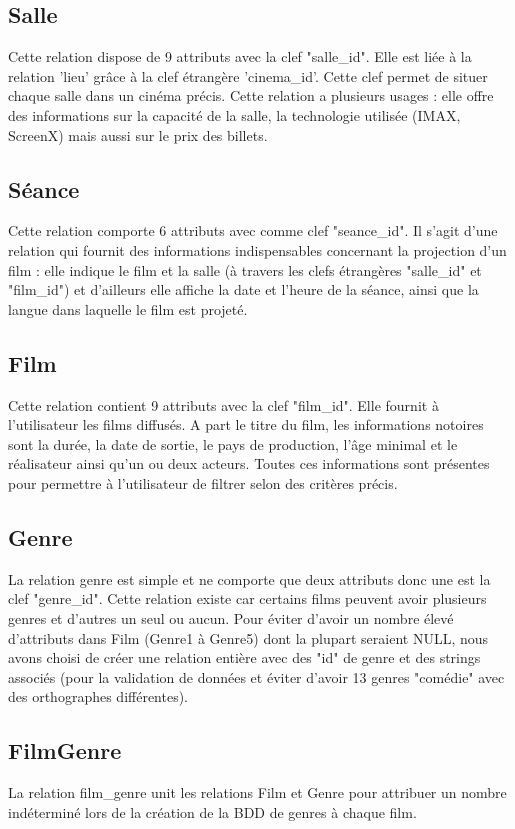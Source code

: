\documentclass[12pt]{article}
\begin{document}
\subsection{Salle}
Cette relation dispose de 9 attributs avec la clef "salle{\_}id".
Elle est liée à la relation 'lieu' grâce à la clef étrangère 'cinema{\_}id'. Cette clef permet de situer chaque salle
dans un cinéma précis. Cette relation a plusieurs usages : elle offre des informations sur la capacité de la salle,
la technologie utilisée (IMAX, ScreenX) mais aussi sur le prix des billets.
\subsection{Séance}
Cette relation comporte 6 attributs avec comme clef "seance{\_}id". Il s'agit d'une relation qui fournit des informations
indispensables concernant la projection d'un film : elle indique le film et la salle (à travers les clefs étrangères "salle{\_}id"
et "film{\_}id") et d'ailleurs elle affiche la date et l'heure de la séance, ainsi que la langue dans laquelle le film est projeté.
\subsection{Film}
Cette relation contient 9 attributs avec la clef "film{\_}id". Elle fournit à l'utilisateur les films diffusés.
A part le titre du film, les informations notoires sont la durée, la date de sortie, le pays de production, l'âge minimal
et le réalisateur ainsi qu'un ou deux acteurs. Toutes ces informations sont présentes pour permettre à l'utilisateur de filtrer selon des critères précis.
\subsection{Genre}
La relation genre est simple et ne comporte que deux attributs donc une est la clef "genre{\_}id". 
Cette relation existe car certains films peuvent avoir plusieurs genres et d'autres un seul ou aucun. Pour éviter d'avoir 
un nombre élevé d'attributs dans Film (Genre1 à Genre5) dont la plupart seraient NULL, nous avons choisi de créer une 
relation entière avec des "id" de genre et des strings associés (pour la validation de données et éviter
d'avoir 13 genres "comédie" avec des orthographes différentes).
\subsection{FilmGenre}
La relation film{\_}genre unit les relations Film et Genre pour attribuer un nombre indéterminé lors de la création de la BDD de genres à chaque film.
\end{document}
